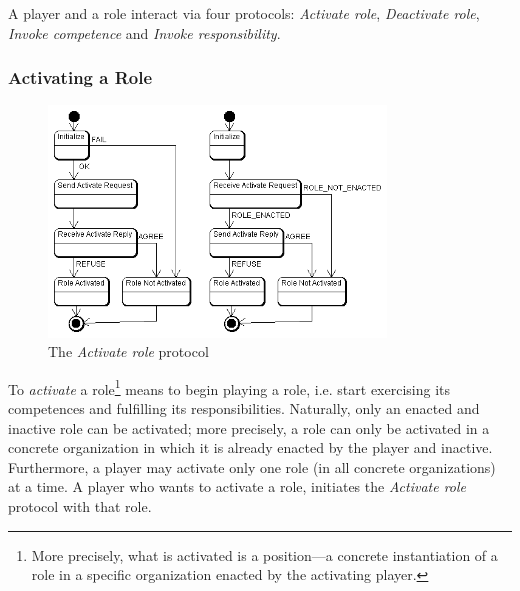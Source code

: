 A player and a role interact via four protocols: \textit{Activate role}, \textit{Deactivate role}, \textit{Invoke competence} and \textit{Invoke responsibility}.

\subsubsection{Activating a Role}
\label{section:activating-a-role}

\begin{figure}[ht]
	\centering
	\includegraphics[width=0.8\textwidth]{images/thespian/activate-role-protocol.png}
	\caption{The \textit{Activate role} protocol}
	\label{figure:thespian-activate-role-protocol}
\end{figure}

To \textit{activate} a role\footnote{More precisely, what is activated is a position---a concrete instantiation of a role in a specific organization enacted by the activating player.} means to begin playing a role, i.e. start exercising its competences and fulfilling its responsibilities.
Naturally, only an enacted and inactive role can be activated; more precisely, a role can only be activated in a concrete organization in which it is already enacted by the player and inactive.
Furthermore, a player may activate only one role (in all concrete organizations) at a time.
A player who wants to activate a role, initiates the \textit{Activate role} protocol with that role.

